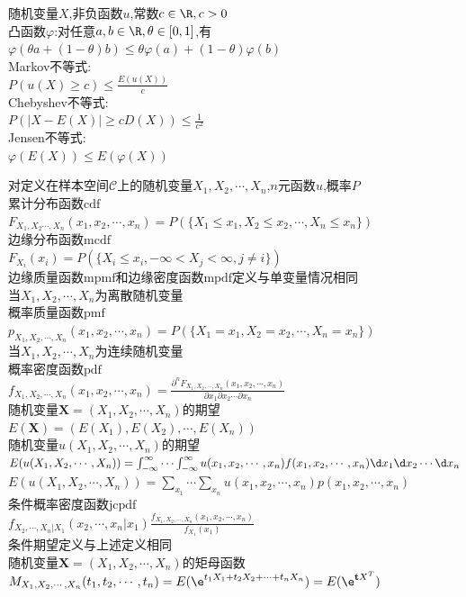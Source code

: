 \begin{dingli}
随机变量$X$,非负函数$u$,常数$c\in \R,c>0$\\
凸函数$\varphi$:对任意$a,b\in\R,\theta\in [0,1]$,有$\varphi(\theta a+(1-\theta)b)\leq\theta \varphi(a)+(1-\theta)\varphi(b)$\\
Markov不等式:\\
$P(u(X)\geq c)\leq \frac{E(u(X))}{c}$\\
Chebyshev不等式:\\
$P(|X-E(X)|\geq cD(X))\leq \frac{1}{c^2}$\\
Jensen不等式:\\
$\varphi(E(X))\leq E(\varphi(X))$
\end{dingli}

\begin{dingyi}
对定义在样本空间$\mathcal{C}$上的随机变量$X_1,X_2,\cdots,X_n$,$n$元函数$u$,概率$P$\\
累计分布函数$\mathrm{cdf}$\\
$F_{X_1,X_2\cdots,X_n}(x_1,x_2,\cdots,x_n)=P(\{X_1\leq x_1,X_2\leq x_2,\cdots,X_n\leq x_n\})$\\
边缘分布函数$\mathrm{mcdf}$\\
$F_{X_i}(x_i)=P(\{X_i\leq x_i,-\infty<X_j<\infty,j\neq i\})$\\
边缘质量函数$\mathrm{mpmf}$和边缘密度函数$\mathrm{mpdf}$定义与单变量情况相同\\
当$X_1,X_2,\cdots,X_n$为离散随机变量\\
概率质量函数$\mathrm{pmf}$\\
$p_{X_1,X_2,\cdots,X_n}(x_1,x_2,\cdots,x_n)=P(\{X_1=x_1,X_2=x_2,\cdots,X_n=x_n\})$\\
当$X_1,X_2,\cdots,X_n$为连续随机变量\\
概率密度函数$\mathrm{pdf}$\\
$f_{X_1,X_2,\cdots,X_n}(x_1,x_2,\cdots,x_n)=\frac{\partial^{n}F_{X_1,X_2,\cdots,X_n}(x_1,x_2,\cdots,x_n)}{\partial x_1\partial x_2\cdots\partial x_n}$\\
随机变量$\mathbf{X} =(X_1,X_2,\cdots,X_n)$的期望\\
$E(\mathbf{X})=(E(X_1),E(X_2),\cdots,E(X_n))$\\
随机变量$u(X_1,X_2,\cdots,X_n)$的期望\\
$E(u(X_1,X_2,\cdots,X_n))=\int_{-\infty}^{\infty}\cdots\int_{-\infty}^{\infty}u(x_1,x_2,\cdots,x_n)f(x_1,x_2,\cdots,x_n)\d x_1\d x_2\cdots \d x_n$\\
$E(u(X_1,X_2,\cdots,X_n))=\sum\limits_{x_1}\cdots\sum\limits_{x_n}u(x_1,x_2,\cdots,x_n)p(x_1,x_2,\cdots,x_n)$\\
条件概率密度函数$\mathrm{jcpdf}$\\
$f_{X_2,\cdots,X_n|X_1}(x_2,\cdots,x_n|x_1)\frac{f_{X_1,X_2,\cdots,X_n}(x_1,x_2,\cdots,x_n)}{f_{X_1}(x_1)}$\\
条件期望定义与上述定义相同\\
随机变量$\mathbf{X} =(X_1,X_2,\cdots,X_n)$的矩母函数\\
$M_{X_1,X_2,\cdots,X_n}(t_1,t_2,\cdots,t_n)=E(\e^{t_1X_1+t_2X_2+\cdots+t_nX_n})=E(\e^{\mathbf{t}X^T})$
\end{dingyi}

